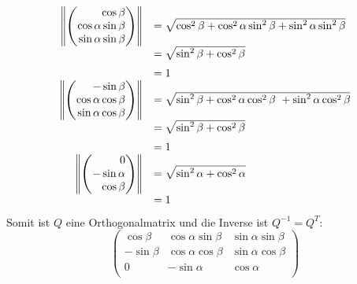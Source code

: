 \documentclass[main.tex]{subfiles}
\begin{document}
\begin{align*}
	\begin{array}{rl}
		\norm*{
			\vektor{
				\cos\beta\\
				\cos\alpha\sin\beta\\
				\sin\alpha\sin\beta
			}
		}
		& = \sqrt{\cos^2\beta +
			\cos^2\alpha\sin^2\beta +
			\sin^2\alpha \sin^2\beta}\\
		& = \sqrt{\sin^2\beta + \cos^2\beta}\\[2mm]
		& = 1\\
		\norm*{
			\vektor{
				-\sin\beta\\
				\cos\alpha\cos\beta\\
				\sin\alpha\cos\beta
			}
		} 
		& = \sqrt{\sin^2\beta +
			 \cos^2\alpha\cos^2\beta\ +
			 \sin^2\alpha \cos^2\beta}\\
		& = \sqrt{\sin^2\beta+\cos^2\beta}\\[2mm]
		& = 1\\
		\norm*{
			\vektor{
				0\\
				-\sin\alpha\\
				\cos\beta
			}
		} 
		& = \sqrt{\sin^2\alpha+\cos^2\alpha}\\
		& = 1
	\end{array}
\end{align*}
Somit ist $Q$ eine Orthogonalmatrix und die Inverse ist $Q^{-1} = Q^T$:
\[
	\begin{pmatrix}
		\cos\beta&\cos\alpha\sin\beta&\sin\alpha\sin\beta\\
		-\sin\beta&\cos\alpha\cos\beta&\sin\alpha\cos\beta\\
		0 & -\sin\alpha & \cos\alpha\\
	\end{pmatrix}
\]
\end{document}
